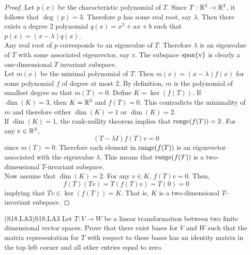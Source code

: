 \documentclass[../../AlgebraQualSolutions.tex]{subfiles}
\begin{document}
	\begin{proof}
		Let $p(x)$ be the characteristic polynomial of $T$. Since $T: \mathbb{R}^3 \to \mathbb{R}^3$, it follows that $\deg(p) = 3$. Therefore $p$ has some real root, say $\lambda$. Then there exists a degree 2 polynomial $q(x) = x^2 + ax + b$ such that $p(x) = (x-\lambda)q(x)$.\\

		Any real root of $p$ corresponds to an eigenvalue of $T$. Therefore $\lambda$ is an eigenvalue of $T$ with some associated eigenvector, say $v$. The subspace $\rm{span}\{v\}$ is clearly a one-dimensional $T$ invariant subspace.\\

		Let $m(x)$ be the minimal polynomial of $T$. Then $m(x) = (x-\lambda)f(x)$ for some polynomial $f$ of degree at most 2. By definition, $m$ is the polynomial of smallest degree so that $m(T) = 0$. Define $K = \ker(f(T))$. If $\dim(K) = 3$, then $K = \mathbb{R}^3$ and $f(T) = 0$. This contradicts the minimality of $m$ and therefore either $\dim(K) = 1$ or $\dim(K) = 2$.\\

		If $\dim(K) = 1$, the rank-nullity theorem implies that $\mathrm{range}(f(T)) = 2$. For any $v \in \mathbb{R}^3$,
			\[(T - \lambda I)f(T)v = 0\]
		since $m(T) = 0$. Therefore each element in $\mathrm{range}(f(T))$ is an eigenvector associated with the eigenvalue $\lambda$. This means that $\mathrm{range}(f(T))$ is a two-dimensional $T$-invariant subspace.\\

		Now assume that $\dim(K) = 2$. For any $v \in K$, $f(T)v = 0$. Then,
			\[f(T)(Tv) = T(f(T)v) = T(0) = 0\]
		implying that $Tv \in \ker(f(T)) = K$. That is, $K$ is a two-dimensional $T$-invariant subspace.
	\end{proof}

	\begin{prob}{(S18.LA3)}{S18.LA3}
		Let $T: V \to W$ be a linear transformation between two finite dimensional vector spaces. Prove that there exist bases for $V$ and $W$ such that the matrix representation for $T$ with respect to these bases has an identity matrix in the top left corner and all other entries equal to zero.
	\end{prob}
\end{document}

